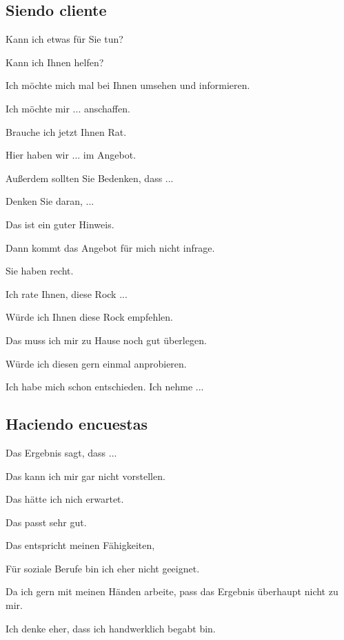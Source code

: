 \subsection{Siendo cliente}
\begin{myitemize}
\item Kann ich etwas für Sie tun?
\item Kann ich Ihnen helfen?
\item Ich möchte mich mal bei Ihnen umsehen und informieren.
\item Ich möchte mir ... anschaffen.
\item Brauche ich jetzt Ihnen Rat.
\item Hier haben wir ... im Angebot.
\item Außerdem sollten Sie Bedenken, dass ...
\item Denken Sie daran, ...
\item Das ist ein guter Hinweis. 
\item Dann kommt das Angebot für mich nicht infrage.
\item Sie haben recht.
\item Ich rate Ihnen, diese Rock ...
\item Würde ich Ihnen diese Rock empfehlen.
\item Das muss ich mir zu Hause noch gut überlegen.
\item Würde ich diesen gern einmal anprobieren.
\item Ich habe mich schon entschieden. Ich nehme ...
\end{myitemize}

\subsection{Haciendo encuestas}
\begin{myitemize}
\item Das Ergebnis sagt, dass ...
\item Das kann ich mir gar nicht vorstellen.
\item Das hätte ich nich erwartet.
\item Das passt sehr gut.
\item Das entspricht meinen Fähigkeiten,
\item Für soziale Berufe bin ich eher nicht geeignet.
\item Da ich gern mit meinen Händen arbeite, pass das Ergebnis überhaupt nicht zu mir.
\item Ich denke eher, dass ich handwerklich begabt bin.
\end{myitemize}
